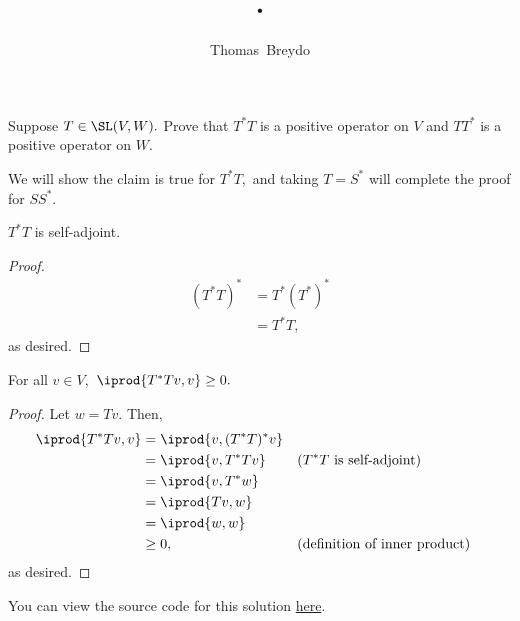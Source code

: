 \documentclass{amsart}
\title{\pagenum.\probnum}
\author{Thomas\ Breydo}
\newcommand{\pagenum}{231}
\newcommand{\probnum}{4}
\begin{document}
\maketitle

\begin{problem*}
Suppose $T\in\SL(V,W).$ Prove that $T^*T$ is a positive operator
on $V$ and $TT^*$ is a positive operator on $W.$
\end{problem*}

\vspace{0.5in}

We will show the claim is true for $T^*T,$ and taking $T=S^*$
will complete the proof for $SS^*.$
\begin{claim*}
$T^*T$ is self-adjoint.
\end{claim*}
\begin{proof}
\begin{align*}
    \left(T^*T\right)^* &= T^*(T^*)^* \\
                        &= T^*T,
\end{align*}
as desired.
\end{proof}

\begin{claim*}
For all $v\in V,$ $\iprod{T^*Tv,v}\ge0.$
\end{claim*}
\begin{proof}
Let $w=Tv.$ Then,
\begin{align*}
    \iprod{T^*Tv,v} &= \iprod{v, (T^*T)^*v} \\
                    &= \iprod{v, T^*Tv} && (T^*T\text{ is self-adjoint}) \\
                    &= \iprod{v, T^*w} \\
                    &= \iprod{Tv, w} \\
                    &= \iprod{w,w} \\
                    &\ge 0, &&(\text{definition of inner product})
\end{align*} 
as desired.
\end{proof}

\vspace{0.5in}

\begin{note*}
You can view the source code for this solution
\href{https://github.com/thomasbreydo/linalg/blob/main/\pagenum_\probnum_Thomas_Breydo.tex}
{here}.
\end{note*}
\end{document}
